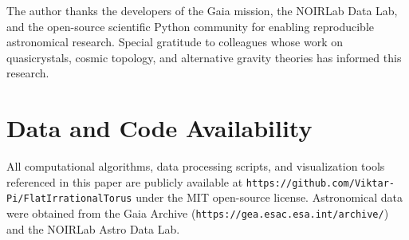 \documentclass[12pt,a4paper,oneside]{article}
\begin{document}
The author thanks the developers of the Gaia mission, the NOIRLab Data Lab, and the open-source scientific Python community for enabling reproducible astronomical research. Special gratitude to colleagues whose work on quasicrystals, cosmic topology, and alternative gravity theories has informed this research.

\section*{Data and Code Availability}

All computational algorithms, data processing scripts, and visualization tools referenced in this paper are publicly available at \texttt{https://github.com/Viktar-Pi/FlatIrrationalTorus} under the MIT open-source license. Astronomical data were obtained from the Gaia Archive (\texttt{https://gea.esac.esa.int/archive/}) and the NOIRLab Astro Data Lab.
\end{document}
